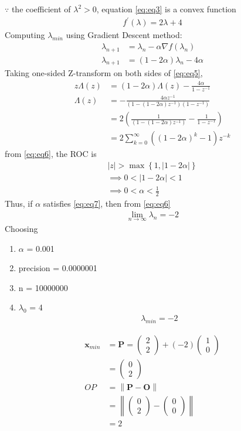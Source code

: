 \documentclass[12pt]{article}
\providecommand{\brak}[1]{\ensuremath{\left(#1\right)}}
\providecommand{\cbrak}[1]{\ensuremath{\left\{#1\right\}}}
\providecommand{\norm}[1]{\left\lVert#1\right\rVert}
\providecommand{\abs}[1]{\left\vert#1\right\vert}
\newcommand{\myvec}[1]{\ensuremath{\begin{pmatrix}#1\end{pmatrix}}}
\let\vec\mathbf
\begin{document}
$\because$ the coefficient of $\lambda^2>0$, equation \eqref{eq:eq3} is a convex function
\begin{align}
	\label{eq:eq4}
	f^\prime\brak{\lambda} = 2\lambda+4
\end{align}
Computing $\lambda_{min}$ using Gradient Descent method:
\begin{align}
	\lambda_{n+1} &= \lambda_n - \alpha\nabla f\brak{\lambda_n}\\
	\label{eq:eq5}
	\lambda_{n+1} &= \brak{1-2\alpha}\lambda_{n} - 4\alpha
\end{align}
Taking one-sided Z-transform on both sides of \eqref{eq:eq5},
\begin{align}
	z\Lambda\brak{z} &= \brak{1-2\alpha}\Lambda\brak{z} - \frac{4\alpha}{1-z^{-1}}\\
	\Lambda\brak{z} &= -\frac{4\alpha z^{-1}}{\brak{1-\brak{1-2\alpha}z^{-1}}\brak{1-z^{-1}}}\\
	&= 2\brak{\frac{1}{\brak{1-\brak{1-2\alpha}z^{-1}}}-\frac{1}{1-z^{-1}}}\\
	\label{eq:eq6}
	&= 2\sum_{k=0}^{\infty}\brak{\brak{1-2\alpha}^{k}-1}z^{-k}
\end{align}
from \eqref{eq:eq6}, the ROC is
\begin{align}
	\abs{z}>\max\cbrak{{1,\abs{1-2\alpha}}}\\
	\implies 0<\abs{1-2\alpha}<1\\
	\label{eq:eq7}
	\implies 0<\alpha<\frac{1}{2}
\end{align}
Thus, if $\alpha$ satisfies \eqref{eq:eq7}, then from \eqref{eq:eq6}
\begin{align}
	\lim_{n\to\infty} \lambda_{n} = -2
\end{align}
Choosing
\begin{enumerate}
\item $\alpha$ = 0.001
\item precision = 0.0000001
\item n = 10000000
\item $\lambda_0$ = 4
\begin{align}
	\lambda_{min} = -2
\end{align}
\end{enumerate}
\begin{align}
	\vec{x}_{min} &= \vec{P} = \myvec{2\\2}+\brak{-2}\myvec{1\\0}\\
	&= \myvec{0\\2}\\
	OP &= \norm{\vec{P}-\vec{O}}\\
	&= \norm{\myvec{0\\2}-\myvec{0\\0}}\\
	&= 2
\end{align}
\end{document}
